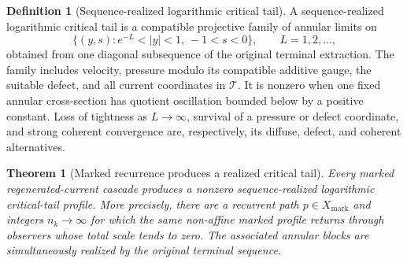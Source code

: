 \documentclass[11pt]{amsart}
\numberwithin{equation}{section}
\theoremstyle{plain}
\newtheorem{theorem}{Theorem}[section]
\theoremstyle{definition}
\newtheorem{definition}[definition]{Definition}
\theoremstyle{remark}
\begin{document}
\begin{definition}[Sequence-realized logarithmic critical tail]
\label{def:sequence-realized-log-tail}
A sequence-realized logarithmic critical tail is a compatible projective
family of annular limits on
\[
 \{(y,s):e^{-L}<|y|<1,\ -1<s<0\},\qquad L=1,2,\ldots,
\]
obtained from one diagonal subsequence of the original terminal extraction.
The family includes velocity, pressure modulo its compatible additive gauge,
the suitable defect, and all current coordinates in \(\mathscr T\).  It is
nonzero when one fixed annular cross-section has quotient oscillation bounded
below by a positive constant.  Loss of tightness as \(L\to\infty\), survival
of a pressure or defect coordinate, and strong coherent convergence are,
respectively, its diffuse, defect, and coherent alternatives.
\end{definition}

\begin{theorem}[Marked recurrence produces a realized critical tail]
\label{thm:marked-recurrence-critical-tail}
Every marked regenerated-current cascade produces a nonzero
sequence-realized logarithmic critical-tail profile.  More precisely, there
are a recurrent path \(p\in X_{\mathrm{mark}}\) and integers
\(n_k\to\infty\) for which the same non-affine marked profile returns through
observers whose total scale tends to zero.  The associated annular blocks are
simultaneously realized by the original terminal sequence.
\end{theorem}
\end{document}
